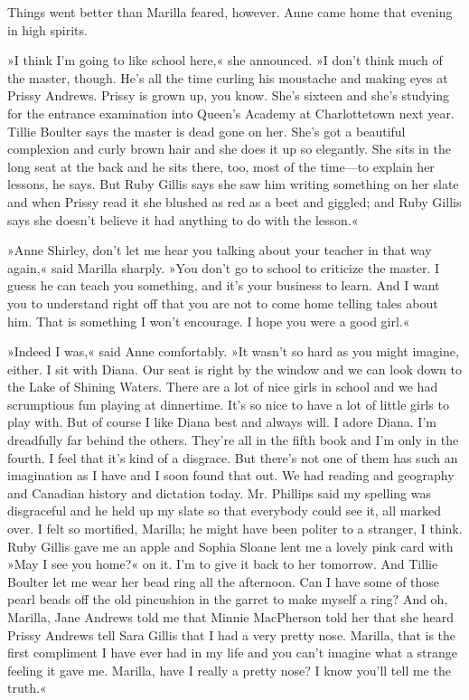 Things went better than Marilla feared, however. Anne came home that evening in high spirits.

»I think I'm going to like school here,« she announced. »I don't think much of the master, though. He's all the time curling his moustache and making eyes at Prissy Andrews. Prissy is grown up, you know. She's sixteen and she's studying for the entrance examination into Queen's Academy at Charlottetown next year. Tillie Boulter says the master is dead gone on her. She's got a beautiful complexion and curly brown hair and she does it up so elegantly. She sits in the long seat at the back and he sits there, too, most of the time—to explain her lessons, he says. But Ruby Gillis says she saw him writing something on her slate and when Prissy read it she blushed as red as a beet and giggled; and Ruby Gillis says she doesn't believe it had anything to do with the lesson.«

»Anne Shirley, don't let me hear you talking about your teacher in that way again,« said Marilla sharply. »You don't go to school to criticize the master. I guess he can teach you something, and it's your business to learn. And I want you to understand right off that you are not to come home telling tales about him. That is something I won't encourage. I hope you were a good girl.«

»Indeed I was,« said Anne comfortably. »It wasn't so hard as you might imagine, either. I sit with Diana. Our seat is right by the window and we can look down to the Lake of Shining Waters. There are a lot of nice girls in school and we had scrumptious fun playing at dinnertime. It's so nice to have a lot of little girls to play with. But of course I like Diana best and always will. I adore Diana. I'm dreadfully far behind the others. They're all in the fifth book and I'm only in the fourth. I feel that it's kind of a disgrace. But there's not one of them has such an imagination as I have and I soon found that out. We had reading and geography and Canadian history and dictation today. Mr. Phillips said my spelling was disgraceful and he held up my slate so that everybody could see it, all marked over. I felt so mortified, Marilla; he might have been politer to a stranger, I think. Ruby Gillis gave me an apple and Sophia Sloane lent me a lovely pink card with »May I see you home?« on it. I'm to give it back to her tomorrow. And Tillie Boulter let me wear her bead ring all the afternoon. Can I have some of those pearl beads off the old pincushion in the garret to make myself a ring? And oh, Marilla, Jane Andrews told me that Minnie MacPherson told her that she heard Prissy Andrews tell Sara Gillis that I had a very pretty nose. Marilla, that is the first compliment I have ever had in my life and you can't imagine what a strange feeling it gave me. Marilla, have I really a pretty nose? I know you'll tell me the truth.«

